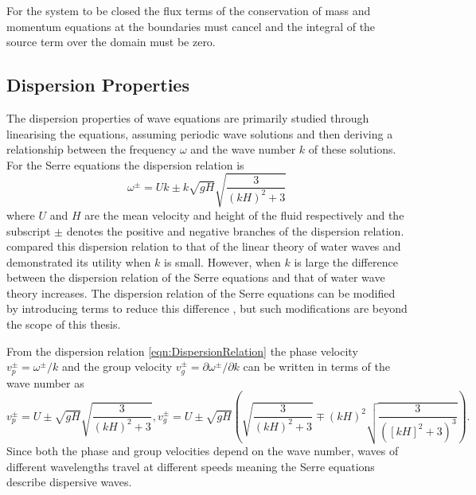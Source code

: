 For the system to be closed the flux terms of the conservation of mass and momentum equations at the boundaries must cancel and the integral of the source term over the domain must be zero.

\subsection{Dispersion Properties}
The dispersion properties of wave equations are primarily studied through linearising the equations, assuming periodic wave solutions and then deriving a relationship between the frequency $\omega$ and the wave number $k$ of these solutions. For the Serre equations the dispersion relation \cite{Li-2014-169} is
\begin{equation}
\label{eqn:DispersionRelation}
\omega^\pm = Uk \pm k \sqrt{gH} \sqrt{\frac{3}{\left(kH\right)^2 + 3}}
\end{equation}
where $U$ and $H$ are the mean velocity and height of the fluid respectively and the subscript $\pm$ denotes the positive and negative branches of the dispersion relation. \citet{Barthelemy-2004-315} compared this dispersion relation to that of the linear theory of water waves and demonstrated its utility when $k$ is small. However, when $k$ is large the difference between the dispersion relation of the Serre equations and that of water wave theory increases. The dispersion relation of the Serre equations can be modified by introducing terms to reduce this difference \cite{Barthelemy-2004-315}, but such modifications are beyond the scope of this thesis.


From the dispersion relation \eqref{eqn:DispersionRelation} the phase velocity $v_p^\pm = \omega^\pm / k$  and the group velocity $v_g^\pm = \partial \omega^\pm / \partial  k$ can be written in terms of the wave number as
\begin{subequations}
	\label{eqn:WaveVelocities}
	\begin{equation}
	\label{eqn:WaveVelocitiesPhase}
	v_p^\pm = U \pm \sqrt{gH}\sqrt{\frac{3}{\left(kH\right)^2 + 3}},
	\end{equation}
	\begin{equation}
	\label{eqn:WaveVelocitiesGroup}
	v_g^\pm = U \pm \sqrt{gH} \left(\sqrt{\frac{3}{\left(kH\right)^2 + 3}} \mp \left(kH\right)^2 \sqrt{\frac{3}{\left(\left[kH\right]^2 + 3 \right)^3}}\right).
	\end{equation}
\end{subequations}
Since both the phase and group velocities depend on the wave number, waves of different wavelengths travel at different speeds meaning the Serre equations describe dispersive waves.

